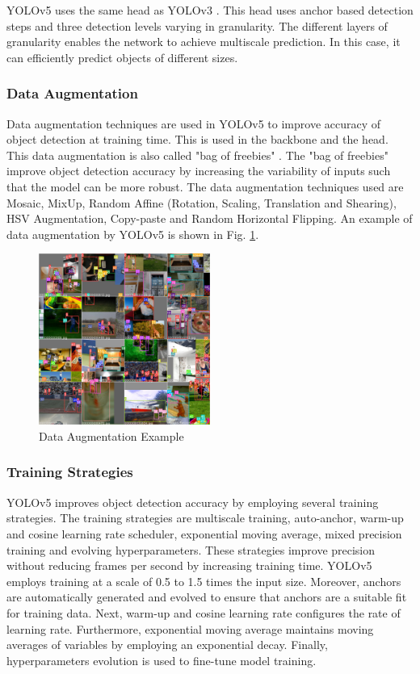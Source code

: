 \documentclass[12pt,a4paper,fleqn]{report}
\begin{document}
YOLOv5 uses the same head as YOLOv3 \cite{yolov3:2018}. 
This head uses anchor based detection steps and three detection levels varying in granularity. 
The different layers of granularity enables the network to achieve multiscale prediction. 
In this case, it can efficiently predict objects of different sizes.


\subsubsection{Data Augmentation}
Data augmentation techniques are used in YOLOv5 to improve accuracy of object
detection at training time. 
This is used in the backbone and the head.
This data augmentation is also called "bag of freebies" \cite{yolov4:2020}. 
The "bag of freebies" improve object detection accuracy by increasing the variability of inputs
such that the model can be more robust. 
The data augmentation techniques used are Mosaic, MixUp, Random Affine (Rotation, Scaling,
Translation and Shearing), HSV Augmentation, Copy-paste and Random Horizontal Flipping. 
An example of data augmentation by YOLOv5 is shown in Fig. \ref{fig:data_augmentation}.

\begin{figure}[htbp]
    \begin{center}
        \includegraphics[width=0.5\textwidth]{figures/augmentation_ex.jpg}
    \end{center}
    \caption{Data Augmentation Example}
    \label{fig:data_augmentation}
\end{figure}


\subsubsection{Training Strategies}
YOLOv5 improves object detection accuracy by employing several training strategies.
The training strategies are multiscale training, auto-anchor, warm-up and cosine learning rate
scheduler, exponential moving average, mixed precision training and evolving hyperparameters.
These strategies improve precision without reducing frames per second by increasing training time.
YOLOv5 employs training at a scale of 0.5 to 1.5 times the input size. 
Moreover, anchors are automatically generated and evolved to ensure that anchors are a suitable fit for 
training data.
Next, warm-up and cosine learning rate configures the rate of learning rate.
Furthermore, exponential moving average maintains moving averages of variables by employing an exponential decay.
Finally, hyperparameters evolution is used to fine-tune model training.
\end{document}
